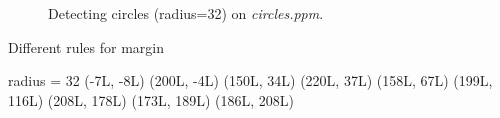 \documentclass[paper=a4, fontsize=11pt]{scrartcl}
\numberwithin{equation}{section}		%
\numberwithin{figure}{section}			%
\begin{document}
\begin{figure}[h]
\centering
{}
\caption{Detecting circles (radius=32) on \emph{circles.ppm}.}
\label{fig:hough:circle:48}
\end{figure}

Different rules for margin 

radius = 32
(-7L, -8L)
(200L, -4L)
(150L, 34L)
(220L, 37L)
(158L, 67L)
(199L, 116L)
(208L, 178L)
(173L, 189L)
(186L, 208L)
\end{document}

